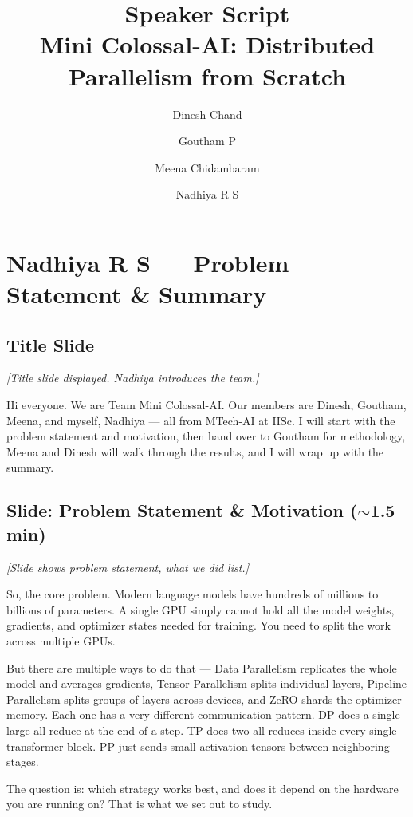 \documentclass[11pt, a4paper]{article}
\title{Speaker Script\\[0.3em]\large Mini Colossal-AI: Distributed Parallelism from Scratch}
\author{Dinesh Chand \and Goutham P \and Meena Chidambaram \and Nadhiya R S}
\date{}
\begin{document}
\maketitle
\tableofcontents
\newpage

\section{Nadhiya R S --- Problem Statement \& Summary}

\subsection{Title Slide}
\textit{[Title slide displayed. Nadhiya introduces the team.]}

Hi everyone. We are Team Mini Colossal-AI. Our members are Dinesh, Goutham, Meena, and myself, Nadhiya --- all from MTech-AI at IISc. I will start with the problem statement and motivation, then hand over to Goutham for methodology, Meena and Dinesh will walk through the results, and I will wrap up with the summary.

\subsection{Slide: Problem Statement \& Motivation ($\sim$1.5 min)}
\textit{[Slide shows problem statement, what we did list.]}

So, the core problem. Modern language models have hundreds of millions to billions of parameters. A single GPU simply cannot hold all the model weights, gradients, and optimizer states needed for training. You need to split the work across multiple GPUs.

But there are multiple ways to do that --- Data Parallelism replicates the whole model and averages gradients, Tensor Parallelism splits individual layers, Pipeline Parallelism splits groups of layers across devices, and ZeRO shards the optimizer memory. Each one has a very different communication pattern. DP does a single large all-reduce at the end of a step. TP does two all-reduces inside every single transformer block. PP just sends small activation tensors between neighboring stages.

The question is: which strategy works best, and does it depend on the hardware you are running on? That is what we set out to study.
\end{document}
